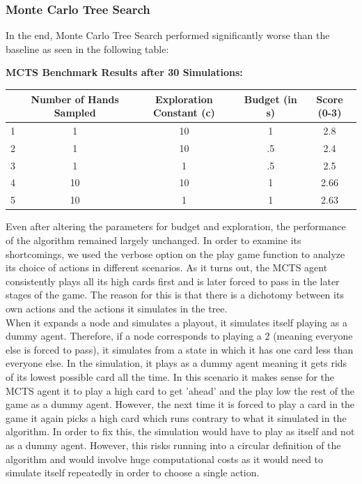 \documentclass[11pt]{article}
\begin{document}
\subsubsection{Monte Carlo Tree Search}

In the end, Monte Carlo Tree Search performed significantly worse than the baseline as seen in the following table:

\begin{center}
\textbf{MCTS Benchmark Results after 30 Simulations:}\\
\begin{tabular}{ c|c|c|c|c } 
 \hline

  & Number of Hands Sampled & Exploration Constant (c) & Budget (in s) & Score  (0-3)\\ 
\hline
 1 & 1 & 10 &  1 & 2.8\\ 
 2 & 1& 10 & .5 & 2.4 \\
3 & 1 & 1 & .5 & 2.5\\
4 & 10 & 10 & 1 & 2.66 \\
5 & 10 & 1 & 1  & 2.63 \\
 \hline
\end{tabular}
\end{center}
Even after altering the parameters for budget and exploration, the performance of the algorithm remained largely unchanged. In order to examine its shortcomings, we used the verbose option on the play game function to analyze its choice of actions in different scenarios. As it turns out, the MCTS agent consistently plays all its high cards first and is later forced to pass in the later stages of the game. The reason for this is that there is a dichotomy between its own actions and the actions it simulates in the tree. \\

When it expands a node and simulates a playout, it simulates itself playing as a dummy agent. Therefore, if a node corresponds to playing a 2 (meaning everyone else is forced to pass), it simulates from a state in which it has one card less than everyone else. In the simulation, it plays as a dummy agent meaning it gets rids of its lowest possible card all the time. In this scenario it makes sense for the MCTS agent it to play a high card to get 'ahead' and the play low the rest of the game as a dummy agent. However, the next time it is forced to play a card in the game it again picks a high card which runs contrary to what it simulated in the algorithm. In order to fix this, the simulation would have to play as itself and not as a dummy agent. However, this risks running into a circular definition of the algorithm and would involve huge computational costs as it would need to simulate itself repeatedly in order to choose a single action.\\
\end{document}
